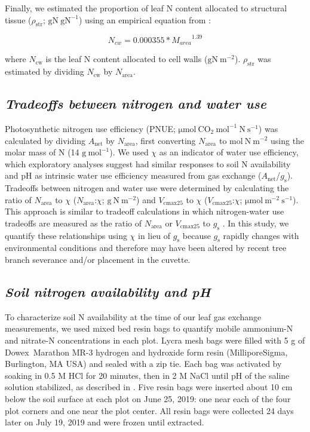 Finally, we estimated the proportion of leaf N content allocated to structural tissue ($\rho_\mathrm{{str}}$; $\mathrm{gN\ gN^{-1}}$) using an empirical equation from :

\begin{equation} \label{eqn_2.14}
    N_{cw}=0.000355*{M_{area}}^{1.39}
\end{equation}
    
\noindent where $N_\mathrm{cw}$ is the leaf N content allocated to cell walls ($\mathrm{gN\ m^{-2}}$). $\rho_\mathrm{{str}}$ was estimated by dividing $N_\mathrm{cw}$ by $N_\mathrm{area}$.


\subsection{\textit{Tradeoffs between nitrogen and water use}}
Photosynthetic nitrogen use efficiency (PNUE; $\mathrm{\mu mol\ CO_2\ mol^{-1}\ N\ s^{-1}}$) was calculated by dividing $A_\mathrm{net}$ by $N_\mathrm{area}$, first converting $N_\mathrm{area}$ to $\mathrm{mol\ N\ m^{-2}}$ using the molar mass of N (14 $\mathrm{g\ mol^{-1}}$). We used $\chi$ as an indicator of water use efficiency, which exploratory analyses suggest had similar responses to soil N availability and pH as intrinsic water use efficiency measured from gas exchange ($A_\mathrm{net}$/$g_\mathrm{s}$). Tradeoffs between nitrogen and water use were determined by calculating the ratio of $N_\mathrm{area}$ to $\chi$ ($N_\mathrm{area}$:$\chi$; $\mathrm{g\ N\ m^{-2}}$) and $V_\mathrm{cmax25}$ to $\chi$ ($V_\mathrm{cmax25}$:$\chi$; $\mathrm{\mu mol\ m^{-2}\ s^{-1}}$). This approach is similar to tradeoff calculations in which nitrogen-water use tradeoffs are measured as the ratio of $N_\mathrm{area}$ or $V_\mathrm{cmax25}$ to $g_\mathrm{s}$ . In this study, we quantify these relationships using $\chi$ in lieu of $g_\mathrm{s}$ because $g_\mathrm{s}$ rapidly changes with environmental conditions and therefore may have been altered by recent tree branch severance and/or placement in the cuvette.

\subsection{\textit{Soil nitrogen availability and pH}}
To characterize soil N availability at the time of our leaf gas exchange measurements, we used mixed bed resin bags to quantify mobile ammonium-N and nitrate-N concentrations in each plot. Lycra mesh bags were filled with 5 g of Dowex\textregistered\ Marathon MR-3 hydrogen and hydroxide form resin (MilliporeSigma, Burlington, MA USA) and sealed with a zip tie. Each bag was activated by soaking in 0.5 M HCl for 20 minutes, then in 2 M NaCl until pH of the saline solution stabilized, as described in . Five resin bags were inserted about 10 cm below the soil surface at each plot on June 25, 2019: one near each of the four plot corners and one near the plot center. All resin bags were collected 24 days later on July 19, 2019 and were frozen until extracted.
    
